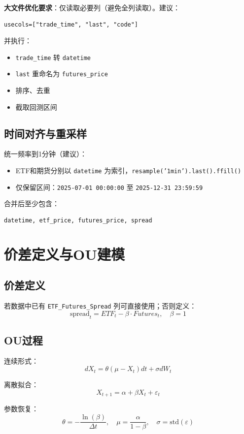 \documentclass[11pt]{article}
\begin{document}
\textbf{大文件优化要求}：仅读取必要列（避免全列读取）。建议：
\begin{lstlisting}
usecols=["trade_time", "last", "code"]
\end{lstlisting}

并执行：
\begin{itemize}
  \item \texttt{trade\_time} 转 \texttt{datetime}
  \item \texttt{last} 重命名为 \texttt{futures\_price}
  \item 排序、去重
  \item 截取回测区间
\end{itemize}

\subsection{时间对齐与重采样}
统一频率到1分钟（建议）：
\begin{itemize}
  \item ETF和期货分别以 \texttt{datetime} 为索引，\texttt{resample('1min').last().ffill()}
  \item 仅保留区间：\texttt{2025-07-01 00:00:00} 至 \texttt{2025-12-31 23:59:59}
\end{itemize}

合并后至少包含：
\begin{lstlisting}
datetime, etf_price, futures_price, spread
\end{lstlisting}

\section{价差定义与OU建模}
\subsection{价差定义}
若数据中已有 \texttt{ETF\_Futures\_Spread} 列可直接使用；否则定义：
\[
\text{spread}_t = ETF_t - \beta \cdot Futures_t,\quad \beta=1
\]

\subsection{OU过程}
连续形式：
\[
dX_t = \theta(\mu - X_t)dt + \sigma dW_t
\]

离散拟合：
\[
X_{t+1}=\alpha + \beta X_t + \varepsilon_t
\]

参数恢复：
\[
\theta = -\frac{\ln(\beta)}{\Delta t},\quad
\mu = \frac{\alpha}{1-\beta},\quad
\sigma=\text{std}(\varepsilon)
\]
\end{document}
